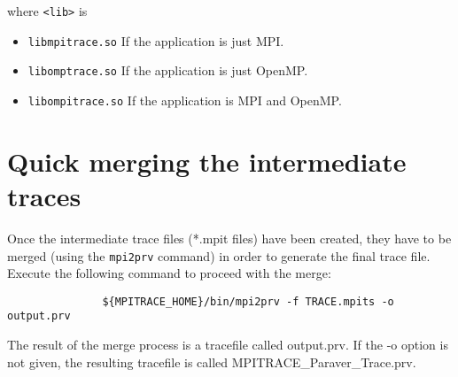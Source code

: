 where {\tt <lib>} is

\begin{itemize}
 \item {\tt libmpitrace.so} If the application is just MPI.
 \item {\tt libomptrace.so} If the application is just OpenMP.
 \item {\tt libompitrace.so} If the application is MPI and OpenMP.
\end{itemize}

\section{Quick merging the intermediate traces}

Once the intermediate trace files (*.mpit files) have been created, they have to be merged (using the {\tt mpi2prv} command) in order to generate the final \PARAVER trace file. Execute the following command to proceed with the merge:

\begin{verbatim}
               ${MPITRACE_HOME}/bin/mpi2prv -f TRACE.mpits -o output.prv
\end{verbatim}

The result of the merge process is a \PARAVER tracefile called output.prv. If the -o option is not given, the resulting tracefile is called MPITRACE\_Paraver\_Trace.prv. 

